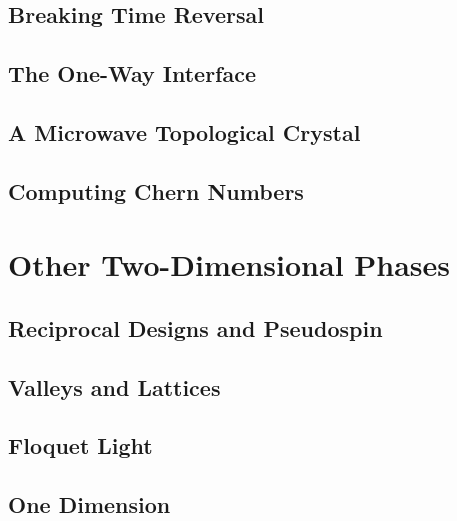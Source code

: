\documentclass[11pt,twoside,openright]{book}
\theoremstyle{plain}
\theoremstyle{definition}
\theoremstyle{remark}
\begin{document}
\chapter{Breaking Time Reversal}
\label{ch:breaking-tr}


\chapter{The One-Way Interface}
\label{ch:one-way-interface}


\chapter{A Microwave Topological Crystal}
\label{ch:microwave-crystal}


\chapter{Computing Chern Numbers}
\label{ch:computing-chern}


\part{Other Two-Dimensional Phases}

\chapter{Reciprocal Designs and Pseudospin}
\label{ch:reciprocal-designs}


\chapter{Valleys and Lattices}
\label{ch:valleys}


\chapter{Floquet Light}
\label{ch:floquet}


\chapter{One Dimension}
\label{ch:one-dimension}

\end{document}
